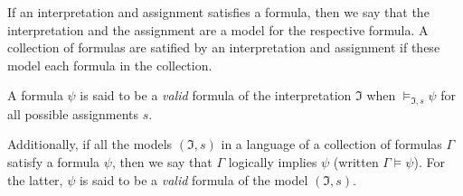 \begin{definition}
If an interpretation and assignment satisfies a formula, then we say that the interpretation and the assignment are a model for the respective formula. A collection of formulas are satified by an interpretation and assignment if these model each formula in the collection.

A formula $\psi$ is said to be a \emph{valid} 
formula of the interpretation $\mathfrak{I}$ 
when $\models_{\mathfrak{I}, s} \psi$ for all 
possible assignments $s$.

Additionally, if all the models $(\mathfrak{I},
s)$ in a language of a collection of formulas 
$\Gamma$ satisfy a formula $\psi$, then we say 
that $\Gamma$ logically implies $\psi$ 
(written $\Gamma \models \psi$). For the 
latter, $\psi$ is said to be a \emph{valid} 
formula of the model $(\mathfrak{I}, s)$.

\end{definition}

